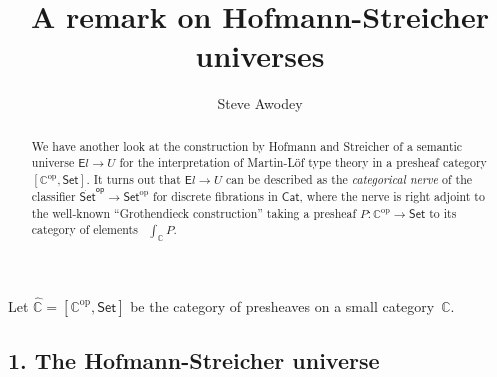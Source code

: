 \documentclass[11pt]{article}
\newcommand{\C}{\ensuremath{\mathbb{C}}}
\newcommand{\op}[1]{\ensuremath{{#1}^{\mathrm{op}}}}
\newcommand{\psh}[1]{\ensuremath{[\op{#1},\mathsf{Set}]}}
\newcommand{\Set}{\ensuremath{\mathsf{Set}}}
\newcommand{\Cat}{\ensuremath{\mathsf{Cat}}}
\renewcommand{\to}{\ensuremath{\rightarrow}}
\theoremstyle{remark}
\theoremstyle{definition}
\begin{document}

\title{A remark on Hofmann-Streicher universes}
\author{Steve Awodey}
\maketitle

\begin{abstract}
We have another look at the construction by Hofmann and Streicher of a semantic universe ${\mathsf{E}l} \to U$ for the interpretation of Martin-L\"of type theory in a presheaf category $\psh{\C}$.  It turns out that ${\mathsf{E}l} \to U$  can be described as the \emph{categorical nerve} of the classifier $\dot{\Set}^{\mathsf{op}} \to \op{\Set}$ for discrete fibrations in $\Cat$, where the nerve is right adjoint to the well-known ``Grothendieck construction'' taking a presheaf $P : \op{\C}\to\Set$ to its category of elements ~$\int_\C P$.
\end{abstract}



\noindent Let $\widehat{\C} = \psh{\C}$ be the category of presheaves on a small category~$\C$.

\subsection*{1. The Hofmann-Streicher universe}\label{sec:U}
\end{document}
